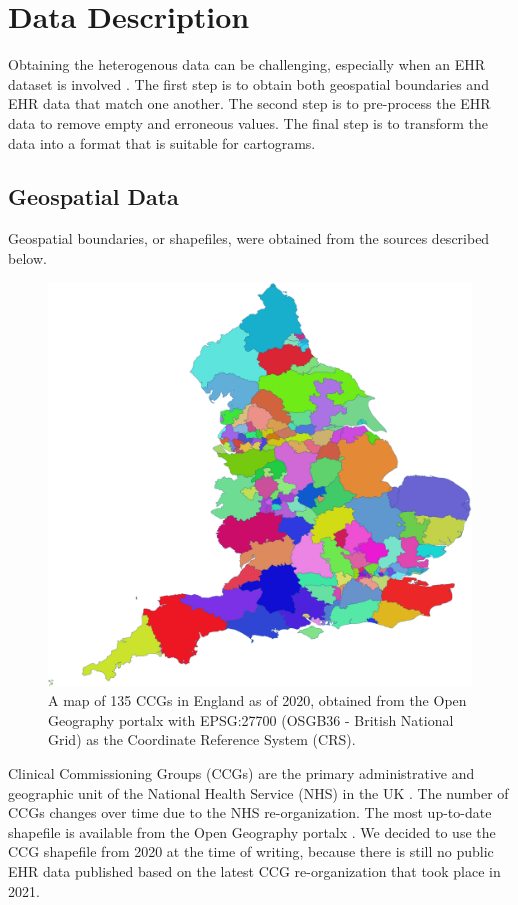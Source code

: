 \section{Data Description}

Obtaining the heterogenous data can be challenging, especially when an EHR dataset is involved \cite{wang2021EHRa}. The first step is to obtain both geospatial boundaries and EHR data that match one another. The second step is to pre-process the EHR data to remove empty and erroneous values. The final step is to transform the data into a format that is suitable for cartograms.

\subsection{Geospatial Data}

Geospatial boundaries, or shapefiles, were obtained from the sources described below.
{
\begin{figure}[tb!]
    \centering
    \includegraphics[width=0.6\columnwidth]{figure/ccg.png}
    \caption{A map of 135 CCGs in England as of 2020, obtained from the Open Geography portalx \cite{opengeographyportalxOpen} with EPSG:27700 (OSGB36 - British National Grid) as the Coordinate Reference System (CRS).}
    \label{fig:ccg}
\end{figure}
}

 Clinical Commissioning Groups (CCGs) are the primary administrative and geographic unit of the National Health Service (NHS) in the UK \cite{nhsNHS}. The number of CCGs changes over time due to the NHS re-organization. The most up-to-date shapefile is available from the Open Geography portalx \cite{opengeographyportalxOpen}. We decided to use the CCG shapefile from 2020 at the time of writing, because there is still no public EHR data published based on the latest CCG re-organization that took place in 2021.

